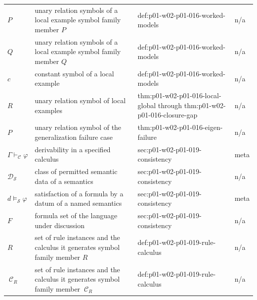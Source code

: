 \begin{longtable}{@{}p{}p{}p{}p{}@{}}
\(P\) & unary relation symbols of a local example symbol family member \(P\) & def:\allowbreak{}p01-\allowbreak{}w02-\allowbreak{}p01-\allowbreak{}016-\allowbreak{}worked-\allowbreak{}models & n/a \\
\(Q\) & unary relation symbols of a local example symbol family member \(Q\) & def:\allowbreak{}p01-\allowbreak{}w02-\allowbreak{}p01-\allowbreak{}016-\allowbreak{}worked-\allowbreak{}models & n/a \\
\(c\) & constant symbol of a local example & def:\allowbreak{}p01-\allowbreak{}w02-\allowbreak{}p01-\allowbreak{}016-\allowbreak{}worked-\allowbreak{}models & n/a \\
\(R\) & unary relation symbol of local examples & thm:\allowbreak{}p01-\allowbreak{}w02-\allowbreak{}p01-\allowbreak{}016-\allowbreak{}local-\allowbreak{}global through thm:\allowbreak{}p01-\allowbreak{}w02-\allowbreak{}p01-\allowbreak{}016-\allowbreak{}closure-\allowbreak{}gap & n/a \\
\(P\) & unary relation symbol of the generalization failure case & thm:\allowbreak{}p01-\allowbreak{}w02-\allowbreak{}p01-\allowbreak{}016-\allowbreak{}eigen-\allowbreak{}failure & n/a \\
\(\Gamma\vdash_{\mathcal C}\varphi\) & derivability in a specified calculus & sec:\allowbreak{}p01-\allowbreak{}w02-\allowbreak{}p01-\allowbreak{}019-\allowbreak{}consistency & meta \\
\(\mathcal D_{\mathcal S}\) & class of permitted semantic data of a semantics & sec:\allowbreak{}p01-\allowbreak{}w02-\allowbreak{}p01-\allowbreak{}019-\allowbreak{}consistency & n/a \\
\(d\models_{\mathcal S}\varphi\) & satisfaction of a formula by a datum of a named semantics & sec:\allowbreak{}p01-\allowbreak{}w02-\allowbreak{}p01-\allowbreak{}019-\allowbreak{}consistency & meta \\
\(F\) & formula set of the language under discussion & sec:\allowbreak{}p01-\allowbreak{}w02-\allowbreak{}p01-\allowbreak{}019-\allowbreak{}consistency & n/a \\
\(R\) & set of rule instances and the calculus it generates symbol family member \(R\) & def:\allowbreak{}p01-\allowbreak{}w02-\allowbreak{}p01-\allowbreak{}019-\allowbreak{}rule-\allowbreak{}calculus & n/a \\
\(\ \mathcal C_R\) & set of rule instances and the calculus it generates symbol family member \(\ \mathcal C_R\) & def:\allowbreak{}p01-\allowbreak{}w02-\allowbreak{}p01-\allowbreak{}019-\allowbreak{}rule-\allowbreak{}calculus & n/a \\

\end{longtable}
